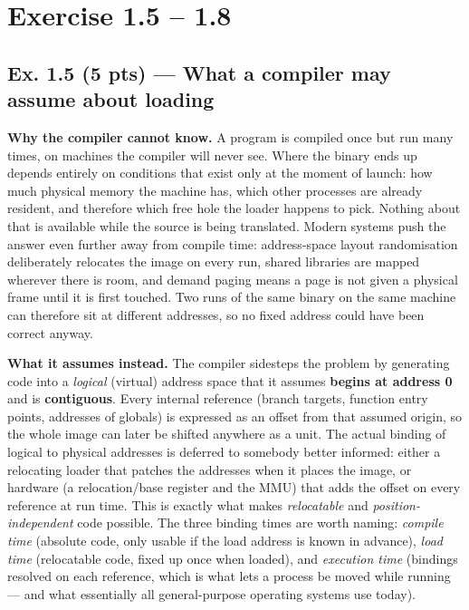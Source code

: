 \section*{Exercise 1.5 -- 1.8}
\label{p2:sec:main}

\subsection*{Ex. 1.5 (5 pts) --- What a compiler may assume about loading}
\label{p2:sec:loadassumptions}

\textbf{Why the compiler cannot know.} A program is compiled once but run many times, on
machines the compiler will never see. Where the binary ends up depends entirely on
conditions that exist only at the moment of launch: how much physical memory the machine
has, which other processes are already resident, and therefore which free hole the loader
happens to pick. Nothing about that is available while the source is being translated.
Modern systems push the answer even further away from compile time: address-space
layout randomisation deliberately relocates the image on every run, shared libraries are
mapped wherever there is room, and demand paging means a page is not given a physical
frame until it is first touched. Two runs of the same binary on the same machine can
therefore sit at different addresses, so no fixed address could have been correct anyway.

\textbf{What it assumes instead.} The compiler sidesteps the problem by generating code
into a \emph{logical} (virtual) address space that it assumes \textbf{begins at address
0} and is \textbf{contiguous}. Every internal reference (branch targets, function
entry points, addresses of globals) is expressed as an offset from that assumed
origin, so the whole image can later be shifted anywhere as a unit. The actual binding of
logical to physical addresses is deferred to somebody better informed: either a
relocating loader that patches the addresses when it places the image, or hardware (a
relocation/base register and the MMU) that adds the offset on every reference at run
time. This is exactly what makes \emph{relocatable} and \emph{position-independent} code
possible. The three binding times are worth naming: \emph{compile time} (absolute code,
only usable if the load address is known in advance), \emph{load time} (relocatable code,
fixed up once when loaded), and \emph{execution time} (bindings resolved on each
reference, which is what lets a process be moved while running --- and what essentially
all general-purpose operating systems use today).

